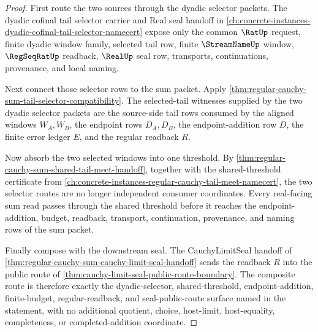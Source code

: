 \begin{proof}
First route the two sources through the dyadic selector packets. The dyadic cofinal tail selector carrier and Real seal handoff in \autoref{ch:concrete-instances-dyadic-cofinal-tail-selector-namecert} expose only the common $\RatUp$ request, finite dyadic window family, selected tail row, finite $\StreamNameUp$ window, $\RegSeqRatUp$ readback, $\RealUp$ seal row, transports, continuations, provenance, and local naming.

Next connect those selector rows to the sum packet. Apply \autoref{thm:regular-cauchy-sum-tail-selector-compatibility}. The selected-tail witnesses supplied by the two dyadic selector packets are the source-side tail rows consumed by the aligned windows $W_A,W_B$, the endpoint rows $D_A,D_B$, the endpoint-addition row $D$, the finite error ledger $E$, and the regular readback $R$.

Now absorb the two selected windows into one threshold. By \autoref{thm:regular-cauchy-sum-shared-tail-meet-handoff}, together with the shared-threshold certificate from \autoref{ch:concrete-instances-regular-cauchy-tail-meet-namecert}, the two selector routes are no longer independent consumer coordinates. Every real-facing sum read passes through the shared threshold before it reaches the endpoint-addition, budget, readback, transport, continuation, provenance, and naming rows of the sum packet.

Finally compose with the downstream seal. The CauchyLimitSeal handoff of \autoref{thm:regular-cauchy-sum-cauchy-limit-seal-handoff} sends the readback $R$ into the public route of \autoref{thm:cauchy-limit-seal-public-route-boundary}. The composite route is therefore exactly the dyadic-selector, shared-threshold, endpoint-addition, finite-budget, regular-readback, and seal-public-route surface named in the statement, with no additional quotient, choice, host-limit, host-equality, completeness, or completed-addition coordinate.
\end{proof}

